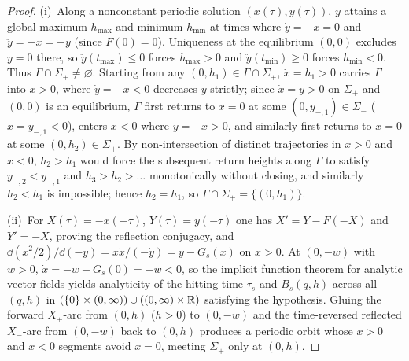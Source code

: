 \begin{proof}
(i)~Along a nonconstant periodic solution $(x(\tau),y(\tau))$, $y$ attains a global maximum $h_{\max}$ and minimum $h_{\min}$ at times where $\dot y=-x=0$ and $\ddot y=-\dot x=-y$ (since $F(0)=0$). Uniqueness at the equilibrium $(0,0)$ excludes $y=0$ there, so $\ddot y(t_{\max})\le 0$ forces $h_{\max}>0$ and $\ddot y(t_{\min})\ge 0$ forces $h_{\min}<0$. Thus $\Gamma\cap\Sigma_+\neq\varnothing$. Starting from any $(0,h_1)\in\Gamma\cap\Sigma_+$, $\dot x=h_1>0$ carries $\Gamma$ into $x>0$, where $\dot y=-x<0$ decreases $y$ strictly; since $\dot x=y>0$ on $\Sigma_+$ and $(0,0)$ is an equilibrium, $\Gamma$ first returns to $x=0$ at some $(0,y_{-,1})\in\Sigma_-$ ($\dot x=y_{-,1}<0$), enters $x<0$ where $\dot y=-x>0$, and similarly first returns to $x=0$ at some $(0,h_2)\in\Sigma_+$. By non-intersection of distinct trajectories in $x>0$ and $x<0$, $h_2>h_1$ would force the subsequent return heights along $\Gamma$ to satisfy $y_{-,2}<y_{-,1}$ and $h_3>h_2>\dots$ monotonically without closing, and similarly $h_2<h_1$ is impossible; hence $h_2=h_1$, so $\Gamma\cap\Sigma_+=\{(0,h_1)\}$.

(ii)~For $X(\tau)=-x(-\tau)$, $Y(\tau)=y(-\tau)$ one has $X'=Y-F(-X)$ and $Y'=-X$, proving the reflection conjugacy, and $\dd(x^2/2)/\dd(-y)=x\dot x/(-\dot y)=y-G_s(x)$ on $x>0$. At $(0,-w)$ with $w>0$, $\dot x=-w-G_s(0)=-w<0$, so the implicit function theorem for analytic vector fields yields analyticity of the hitting time $\tau_s$ and $B_s(q,h)$ across all $(q,h)$ in $(\{0\}\times(0,\infty))\cup((0,\infty)\times\mathbb{R})$ satisfying the hypothesis. Gluing the forward $X_+$-arc from $(0,h)$ ($h>0$) to $(0,-w)$ and the time-reversed reflected $X_-$-arc from $(0,-w)$ back to $(0,h)$ produces a periodic orbit whose $x>0$ and $x<0$ segments avoid $x=0$, meeting $\Sigma_+$ only at $(0,h)$.


\end{proof}

